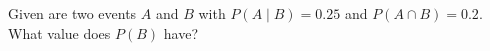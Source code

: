 Given are two events $A$ and $B$ with $P(A \mid B) = 0.25$ and $P(A \cap B) = 0.2$.
What value does $P(B)$ have?